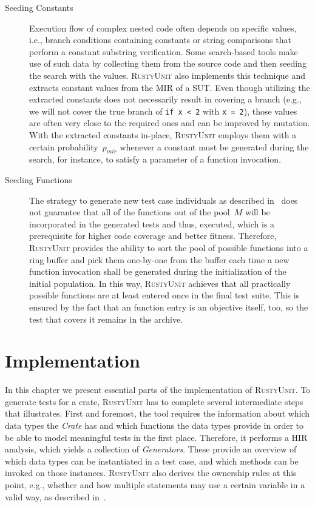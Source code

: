 \documentclass[paper=a4,%
  twoside,%
  BCOR4mm,%
  abstract=true,%
  toc=bibliography,%
  chapterprefix=true,%
  toc=bibliographynumbered,%
  open=right,%
  english,%
  pagesize=pdftex]{scrreprt}
\newcommand{\tech}{\textsc{RustyUnit}\xspace}
\newcommand{\hir}{\ac{HIR}\xspace}
\newcommand{\mir}{\ac{MIR}\xspace}
\newcommand{\sut}{\ac{SUT}\xspace}
\begin{document}
\begin{description}
  \item[Seeding Constants] Execution flow of complex nested code often depends on specific values, i.e., branch conditions containing constants or string comparisons that perform a constant substring verification. Some search-based tools make use of such data by collecting them from the source code and then seeding the search with the values. \tech also implements this technique and extracts constant values from the \mir of a \sut. Even though utilizing the extracted constants does not necessarily result in covering a branch (e.g., we will not cover the true branch of \texttt{if x < 2} with \texttt{x = 2}), those values are often very close to the required ones and can be improved by mutation. With the extracted constants in-place, \tech employs them with a certain probability~$p_{mir}$ whenever a constant must be generated during the search, for instance, to satisfy a parameter of a function invocation.
  \item[Seeding Functions] The strategy to generate new test case individuals as described in~ does not guarantee that all of the functions out of the pool~$M$ will be incorporated in the generated tests and thus, executed, which is a prerequisite for higher code coverage and better fitness. Therefore, \tech provides the ability to sort the pool of possible functions into a ring buffer and pick them one-by-one from the buffer each time a new function invocation shall be generated during the initialization of the initial population. In this way, \tech achieves that all practically possible functions are at least entered once in the final test suite. This is ensured by the fact that an function entry is an objective itself, too, so the test that covers it remains in the archive.
\end{description}


\clearpage
\chapter{Implementation}
\label{chap:implementation}
In this chapter we present essential parts of the implementation of \tech. To generate tests for a crate, \tech has to complete several intermediate steps that  illustrates. First and foremost, the tool requires the information about which data types the \emph{Crate} has and which functions the data types provide in order to be able to model meaningful tests in the first place. Therefore, it performs a \hir analysis, which yields a collection of \emph{Generators}. These provide an overview of which data types can be instantiated in a test case, and which methods can be invoked on those instances. \tech also derives the ownership rules at this point, e.g., whether and how multiple statements may use a certain variable in a valid way, as described in~.
\end{document}
